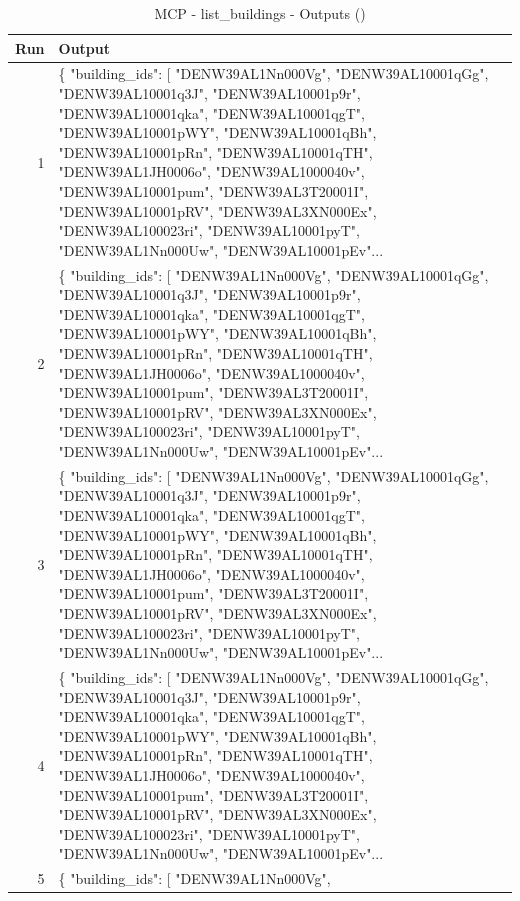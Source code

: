 \documentclass[a4paper,11pt]{article}
\begin{document}
\clearpage

\begin{table}[ht]
\centering
\scriptsize
\caption{MCP - list\_buildings - Outputs ()}
\label{tab:mcp\_list\_buildings\_outputs\_}
\begin{tabular}{r p{12cm}}
\hline
Run & Output \\
\hline
1 & \{
  "building\_ids": [
    "DENW39AL1Nn000Vg",
    "DENW39AL10001qGg",
    "DENW39AL10001q3J",
    "DENW39AL10001p9r",
    "DENW39AL10001qka",
    "DENW39AL10001qgT",
    "DENW39AL10001pWY",
    "DENW39AL10001qBh",
    "DENW39AL10001pRn",
    "DENW39AL10001qTH",
    "DENW39AL1JH0006o",
    "DENW39AL1000040v",
    "DENW39AL10001pum",
    "DENW39AL3T20001I",
    "DENW39AL10001pRV",
    "DENW39AL3XN000Ex",
    "DENW39AL100023ri",
    "DENW39AL10001pyT",
    "DENW39AL1Nn000Uw",
    "DENW39AL10001pEv"... \\
2 & \{
  "building\_ids": [
    "DENW39AL1Nn000Vg",
    "DENW39AL10001qGg",
    "DENW39AL10001q3J",
    "DENW39AL10001p9r",
    "DENW39AL10001qka",
    "DENW39AL10001qgT",
    "DENW39AL10001pWY",
    "DENW39AL10001qBh",
    "DENW39AL10001pRn",
    "DENW39AL10001qTH",
    "DENW39AL1JH0006o",
    "DENW39AL1000040v",
    "DENW39AL10001pum",
    "DENW39AL3T20001I",
    "DENW39AL10001pRV",
    "DENW39AL3XN000Ex",
    "DENW39AL100023ri",
    "DENW39AL10001pyT",
    "DENW39AL1Nn000Uw",
    "DENW39AL10001pEv"... \\
3 & \{
  "building\_ids": [
    "DENW39AL1Nn000Vg",
    "DENW39AL10001qGg",
    "DENW39AL10001q3J",
    "DENW39AL10001p9r",
    "DENW39AL10001qka",
    "DENW39AL10001qgT",
    "DENW39AL10001pWY",
    "DENW39AL10001qBh",
    "DENW39AL10001pRn",
    "DENW39AL10001qTH",
    "DENW39AL1JH0006o",
    "DENW39AL1000040v",
    "DENW39AL10001pum",
    "DENW39AL3T20001I",
    "DENW39AL10001pRV",
    "DENW39AL3XN000Ex",
    "DENW39AL100023ri",
    "DENW39AL10001pyT",
    "DENW39AL1Nn000Uw",
    "DENW39AL10001pEv"... \\
4 & \{
  "building\_ids": [
    "DENW39AL1Nn000Vg",
    "DENW39AL10001qGg",
    "DENW39AL10001q3J",
    "DENW39AL10001p9r",
    "DENW39AL10001qka",
    "DENW39AL10001qgT",
    "DENW39AL10001pWY",
    "DENW39AL10001qBh",
    "DENW39AL10001pRn",
    "DENW39AL10001qTH",
    "DENW39AL1JH0006o",
    "DENW39AL1000040v",
    "DENW39AL10001pum",
    "DENW39AL3T20001I",
    "DENW39AL10001pRV",
    "DENW39AL3XN000Ex",
    "DENW39AL100023ri",
    "DENW39AL10001pyT",
    "DENW39AL1Nn000Uw",
    "DENW39AL10001pEv"... \\
5 & \{
  "building\_ids": [
    "DENW39AL1Nn000Vg",

\end{tabular}
\end{table}
\end{document}
